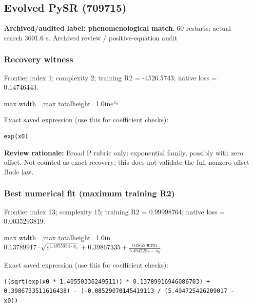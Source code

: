 \documentclass[10pt,letterpaper,landscape]{article}
\begin{document}
\begin{minipage}[t]{0.485\textwidth}
\subsection*{Evolved PySR (709715)}
\textbf{Archived/audited label: phenomenological match.} 60 restarts; actual search 3601.6 s.
{\small Archived review / positive-equation audit}
\subsubsection*{Recovery witness}
Frontier index 1; complexity 2; training R2 = -4526.5743; native loss = 0.14746443.
\begin{center}\begin{adjustbox}{max width=\linewidth,max totalheight=1.0in}$\displaystyle e^{x_{0}}$\end{adjustbox}\end{center}
{\scriptsize Exact saved expression (use this for coefficient checks):}
\begin{lstlisting}
exp(x0)
\end{lstlisting}
{\small\textbf{Review rationale:} Broad P rubric only: exponential family, possibly with zero offset. Not counted as exact recovery; this does not validate the full nonzero-offset Bode law.}
\subsubsection*{Best numerical fit (maximum training R2)}
Frontier index 13; complexity 15; training R2 = 0.99998764; native loss = 0.0035293819.
\begin{center}\begin{adjustbox}{max width=\linewidth,max totalheight=1.0in}$\displaystyle 0.13789917 \cdot \sqrt{e^{1.4055034 \cdot x_{0}}} + 0.39867335 + \frac{0.085290701}{5.4947254 - x_{0}}$\end{adjustbox}\end{center}
{\scriptsize Exact saved expression (use this for coefficient checks):}
\begin{lstlisting}
((sqrt(exp(x0 * 1.40550336249511)) * 0.13789916946086703) + 0.3986733511616438) - (-0.08529070145419113 / (5.494725426209017 - x0))
\end{lstlisting}
\end{minipage}
\clearpage{}\label{bode-10002}
\end{document}

